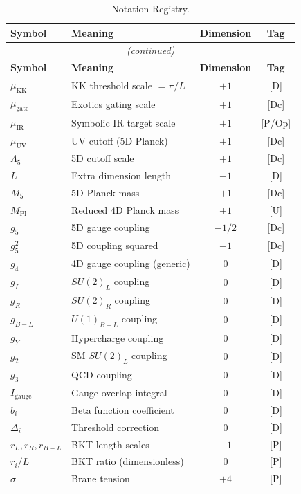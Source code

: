 \documentclass[11pt,a4paper]{article}
\begin{document}
\begin{longtable}{lp{5cm}cc}
\caption{Notation Registry.}
\label{tab:notation-registry} \\
\toprule
\textbf{Symbol} & \textbf{Meaning} & \textbf{Dimension} & \textbf{Tag} \\
\midrule
\endfirsthead
\multicolumn{4}{c}{\textit{(continued)}} \\
\toprule
\textbf{Symbol} & \textbf{Meaning} & \textbf{Dimension} & \textbf{Tag} \\
\midrule
\endhead
\bottomrule
\endfoot
$\mu_{\text{KK}}$ & KK threshold scale $= \pi/L$ & $+1$ & [D] \\
$\mu_{\text{gate}}$ & Exotics gating scale & $+1$ & [Dc] \\
$\mu_{\text{IR}}$ & Symbolic IR target scale & $+1$ & [P/Op] \\
$\mu_{\text{UV}}$ & UV cutoff (5D Planck) & $+1$ & [Dc] \\
$\Lambda_5$ & 5D cutoff scale & $+1$ & [Dc] \\
$L$ & Extra dimension length & $-1$ & [D] \\
$M_5$ & 5D Planck mass & $+1$ & [Dc] \\
$\bar{M}_{\text{Pl}}$ & Reduced 4D Planck mass & $+1$ & [U] \\
$g_5$ & 5D gauge coupling & $-1/2$ & [Dc] \\
$g_5^2$ & 5D coupling squared & $-1$ & [Dc] \\
$g_4$ & 4D gauge coupling (generic) & $0$ & [D] \\
$g_L$ & $SU(2)_L$ coupling & $0$ & [D] \\
$g_R$ & $SU(2)_R$ coupling & $0$ & [D] \\
$g_{B-L}$ & $U(1)_{B-L}$ coupling & $0$ & [D] \\
$g_Y$ & Hypercharge coupling & $0$ & [D] \\
$g_2$ & SM $SU(2)_L$ coupling & $0$ & [D] \\
$g_3$ & QCD coupling & $0$ & [D] \\
$I_{\text{gauge}}$ & Gauge overlap integral & $0$ & [D] \\
$b_i$ & Beta function coefficient & $0$ & [D] \\
$\Delta_i$ & Threshold correction & $0$ & [D] \\
$r_L, r_R, r_{B-L}$ & BKT length scales & $-1$ & [P] \\
$r_i/L$ & BKT ratio (dimensionless) & $0$ & [P] \\
$\sigma$ & Brane tension & $+4$ & [P] \\

\end{longtable}
\end{document}
